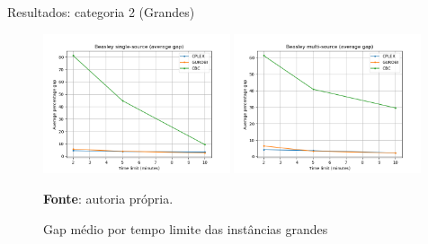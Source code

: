 \documentclass[aspectratio=169]{beamer}
\begin{document}
	
	
	
	\begin{frame}{Resultados: categoria 2 (Grandes)} %
		
		\begin{figure}[H]
			\begin{center}
				\caption{Gap médio por tempo limite das instâncias grandes \cite{Beasley}}
				
				\includegraphics[width=0.49\textwidth]{res/Beasley SS large - Average gap x Time.png}
				\includegraphics[width=0.49\textwidth]{res/Beasley MS large - Average gap x Time.png}
				\label{Gap:T:Beasley}
				
				\textbf{Fonte}: autoria própria.
			\end{center}
		\end{figure}
		
	\end{frame}
	
\end{document}
